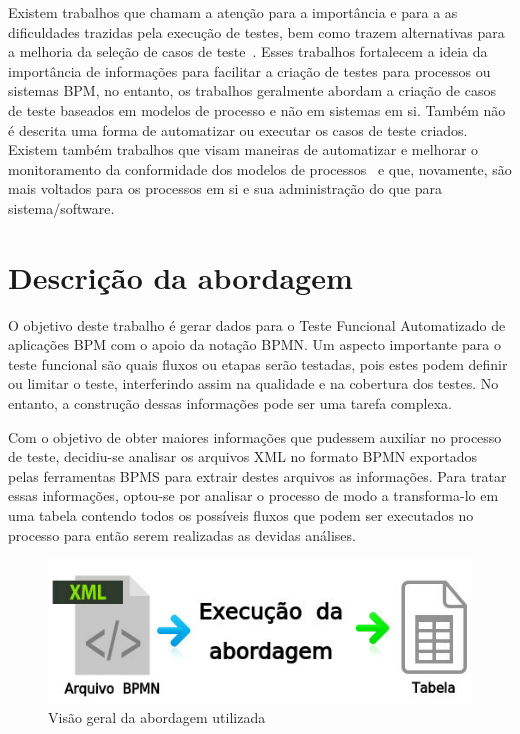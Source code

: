 \documentclass[12pt]{article}
\begin{document}
Existem trabalhos que chamam a atenção para a importância e para a as dificuldades trazidas pela execução de testes, bem como trazem alternativas para a melhoria da seleção de casos de teste~\cite{bohmer2015genetic}. Esses trabalhos fortalecem a ideia da importância de informações para facilitar a criação de testes para processos ou sistemas BPM, no entanto, os trabalhos geralmente abordam a criação de casos de teste baseados em modelos de processo e não em sistemas em si. Também não é descrita uma forma de automatizar ou executar os casos de teste criados. Existem também trabalhos que visam maneiras de automatizar e melhorar o monitoramento da conformidade dos modelos de processos~\cite{ly2015compliance, van2012replaying} e que, novamente, são mais voltados para os processos em si e sua administração do que para sistema/software.

\section{Descrição da abordagem}
O objetivo deste trabalho é gerar dados para o Teste Funcional Automatizado de aplicações BPM com o apoio da notação BPMN. Um aspecto importante para o teste funcional são quais fluxos ou etapas serão testadas, pois estes podem definir ou limitar o teste, interferindo assim na qualidade e na cobertura dos testes. No entanto, a construção dessas informações pode ser uma tarefa complexa.

Com o objetivo de obter maiores informações que pudessem auxiliar no processo de teste, decidiu-se analisar os arquivos XML no formato BPMN exportados pelas ferramentas BPMS para extrair destes arquivos as informações. Para tratar essas informações, optou-se por analisar o processo de modo a transforma-lo em uma tabela contendo todos os possíveis fluxos que podem ser executados no processo para então serem realizadas as devidas análises. 

\begin{figure}[ht]
\centering
\includegraphics[width=.8\textwidth]{figuras/abordagem1.png}
\caption{Visão geral da abordagem utilizada}
\label{fig:abordagem1}
\end{figure}
\end{document}
